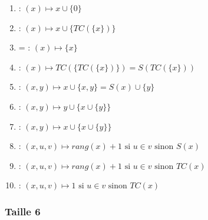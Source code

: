 \documentclass[a4paper, 11pt]{article}
\begin{document}
\begin{enumerate}
    \item {}: $(x) \mapsto x \cup \{0\}$
    \item {}: $(x) \mapsto x \cup \{TC(\{x\})\}$
    \item {} = : $(x) \mapsto \{x\}$
    \item {}: $(x) \mapsto TC(\{TC(\{x\})\}) = S(TC(\{x\}))$
    \item {}: $(x, y) \mapsto x \cup \{x , y\} = S(x) \cup \{y\}$
    \item {}: $(x, y) \mapsto y \cup \{x \cup \{y\}\}$
    \item {}: $(x, y) \mapsto x \cup \{x \cup \{y\}\}$
    \item {}: $(x, u, v) \mapsto rang(x) + 1 \mbox{ si } u \in v \mbox{ sinon } S(x)$
    \item {}: $(x, u, v) \mapsto rang(x) + 1 \mbox{ si } u \in v \mbox{ sinon } TC(x)$
    \item {}: $(x, u, v) \mapsto 1 \mbox{ si } u \in v \mbox{ sinon } TC(x)$
\end{enumerate}

\subsubsection{Taille 6}
\end{document}

